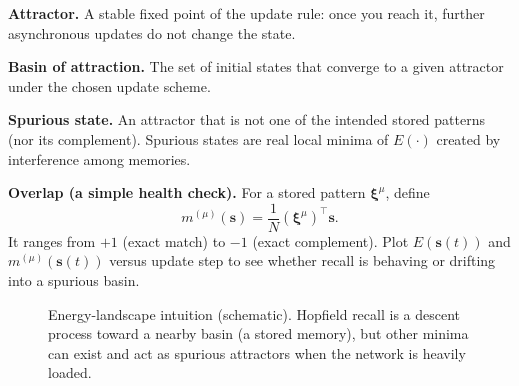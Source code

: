 \begin{tcolorbox}[summarybox, title={Terminology and diagnostics}]
\textbf{Attractor.} A stable fixed point of the update rule: once you reach it, further asynchronous updates do not change the state.

\textbf{Basin of attraction.} The set of initial states that converge to a given attractor under the chosen update scheme.

\textbf{Spurious state.} An attractor that is not one of the intended stored patterns (nor its complement). Spurious states are real local minima of \(E(\cdot)\) created by interference among memories.

\textbf{Overlap (a simple health check).} For a stored pattern \(\mathbf{\xi}^\mu\), define
\[
m^{(\mu)}(\mathbf{s}) = \frac{1}{N} (\mathbf{\xi}^\mu)^\top \mathbf{s}.
\]
It ranges from \(+1\) (exact match) to \(-1\) (exact complement). Plot \(E(\mathbf{s}(t))\) and \(m^{(\mu)}(\mathbf{s}(t))\) versus update step to see whether recall is behaving or drifting into a spurious basin.
\end{tcolorbox}

\begin{figure}[t]
    \centering
    \caption{Energy-landscape intuition (schematic). Hopfield recall is a descent process toward a nearby basin (a stored memory), but other minima can exist and act as spurious attractors when the network is heavily loaded.}
    \label{fig:hopfield-basins-schematic}
\end{figure}

